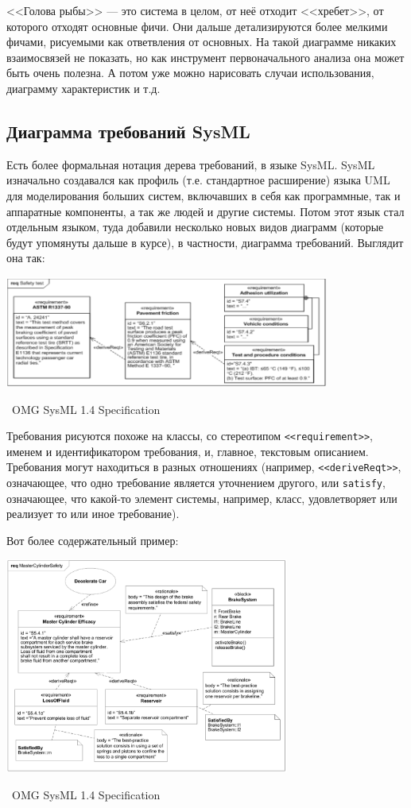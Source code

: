 \documentclass[a5paper]{article}
\newcommand{\attribution}[1] {
    \vspace{-4mm}\begin{flushright}\begin{scriptsize}%
    {\textcopyright\, #1}\end{scriptsize}\end{flushright}
}
\begin{document}
<<Голова рыбы>> --- это система в целом, от неё отходит <<хребет>>, от которого отходят основные фичи. Они дальше детализируются более мелкими фичами, рисуемыми как ответвления от основных. На такой диаграмме никаких взаимосвязей не показать, но как инструмент первоначального анализа она может быть очень полезна. А потом уже можно нарисовать случаи использования, диаграмму характеристик и т.д.

\subsection{Диаграмма требований SysML}

Есть более формальная нотация дерева требований, в языке SysML. SysML изначально создавался как профиль (т.е. стандартное расширение) языка UML для моделирования больших систем, включавших в себя как программные, так и аппаратные компоненты, а так же людей и другие системы. Потом этот язык стал отдельным языком, туда добавили несколько новых видов диаграмм (которые будут упомянуты дальше в курсе), в частности, диаграмма требований. Выглядит она так:

\begin{center}
    \includegraphics[width=0.8\textwidth]{sysMlRequirementDiagram.png}
    \attribution{OMG SysML 1.4 Specification}
\end{center}

Требования рисуются похоже на классы, со стереотипом \verb|<<requirement>>|, именем и идентификатором требования, и, главное, текстовым описанием. Требования могут находиться в разных отношениях (например, \verb|<<deriveReqt>>|, означающее, что одно требование является уточнением другого, или \verb|satisfy|, означающее, что какой-то элемент системы, например, класс, удовлетворяет или реализует то или иное требование).

Вот более содержательный пример:

\begin{center}
    \includegraphics[width=0.7\textwidth]{sysMlRequirementsExample.png}
    \attribution{OMG SysML 1.4 Specification}
\end{center}
\end{document}
